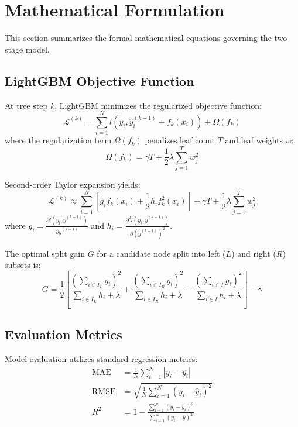 \documentclass[journal,onecolumn,11pt]{IEEEtran}
\begin{document}
\section{Mathematical Formulation}

This section summarizes the formal mathematical equations governing the two-stage model.

\subsection{LightGBM Objective Function}
At tree step $k$, LightGBM minimizes the regularized objective function:
\begin{equation}
    \mathcal{L}^{(k)} = \sum_{i=1}^{N} l\left(y_i, \hat{y}_i^{(k-1)} + f_k(x_i)\right) + \Omega(f_k)
\end{equation}
where the regularization term $\Omega(f_k)$ penalizes leaf count $T$ and leaf weights $w$:
\begin{equation}
    \Omega(f_k) = \gamma T + \frac{1}{2}\lambda \sum_{j=1}^{T} w_j^2
\end{equation}

Second-order Taylor expansion yields:
\begin{equation}
    \mathcal{L}^{(k)} \approx \sum_{i=1}^{N} \left[ g_i f_k(x_i) + \frac{1}{2} h_i f_k^2(x_i) \right] + \gamma T + \frac{1}{2}\lambda \sum_{j=1}^{T} w_j^2
\end{equation}
where $g_i = \frac{\partial l(y_i, \hat{y}^{(k-1)})}{\partial \hat{y}^{(k-1)}}$ and $h_i = \frac{\partial^2 l(y_i, \hat{y}^{(k-1)})}{\partial (\hat{y}^{(k-1)})^2}$.

The optimal split gain $G$ for a candidate node split into left ($L$) and right ($R$) subsets is:
\begin{equation}
    G = \frac{1}{2} \left[ \frac{\left(\sum_{i \in I_L} g_i\right)^2}{\sum_{i \in I_L} h_i + \lambda} + \frac{\left(\sum_{i \in I_R} g_i\right)^2}{\sum_{i \in I_R} h_i + \lambda} - \frac{\left(\sum_{i \in I} g_i\right)^2}{\sum_{i \in I} h_i + \lambda} \right] - \gamma
\end{equation}

\subsection{Evaluation Metrics}
Model evaluation utilizes standard regression metrics:
\begin{align}
    \text{MAE} &= \frac{1}{N} \sum_{i=1}^{N} |y_i - \hat{y}_i| \\
    \text{RMSE} &= \sqrt{\frac{1}{N} \sum_{i=1}^{N} (y_i - \hat{y}_i)^2} \\
    R^2 &= 1 - \frac{\sum_{i=1}^{N} (y_i - \hat{y}_i)^2}{\sum_{i=1}^{N} (y_i - \bar{y})^2}
\end{align}
\end{document}
